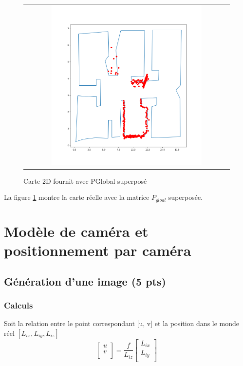 \documentclass[12pt]{article}
\begin{document}
\begin{figure}[ht]
 \begin{center}
  \begin{tabular}{c}
    \includegraphics[width=0.75\textwidth]{q1-carte-nuage-superpose.png}
  \end{tabular}
 \end{center}
\vspace{-0.25in}
 \caption{Carte 2D fournit avec PGlobal superpos\'e}
    \label{carte-pglobal}
\end{figure}

La figure \ref{carte-pglobal} montre la carte réelle avec la matrice $P_{gloal}$ superposée.

\newpage
\section{Modèle de caméra et positionnement par caméra}

\subsection{Génération d'une image (5 pts)}
\label{generation_image}
\subsubsection{Calculs}
Soit la relation entre le point correspondant [u, v] et la position dans le monde r\'eel $ [L_{ix}, L_{iy}, L_{iz}] $
\[ \left[ {\begin{array}{c}
                u \\
    v \\ \end{array} } \right] =
    \frac{f}{L_{iz}}
    \left[ {\begin{array}{c} L_{ix} \\ L_{iy} \\ \end{array}} \right]
\]
\end{document}
